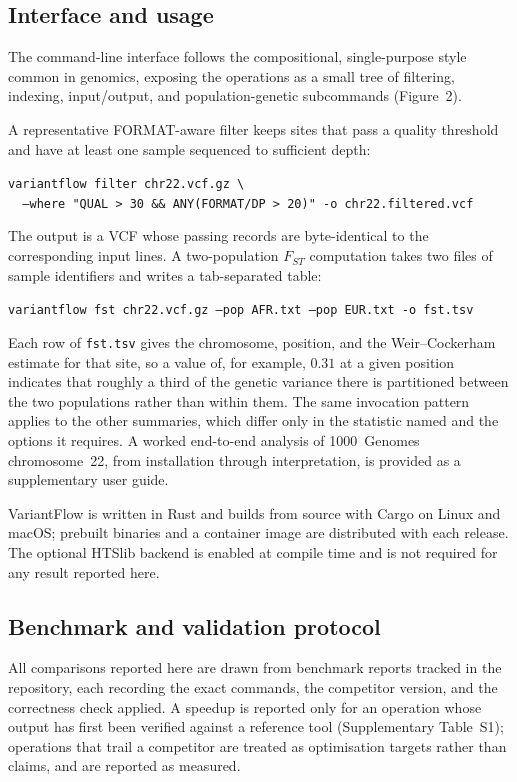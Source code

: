 \subsection{Interface and usage}

The command-line interface follows the compositional, single-purpose style common
in genomics, exposing the operations as a small tree of filtering, indexing,
input/output, and population-genetic subcommands (Figure~2).

A representative FORMAT-aware filter keeps sites that pass a quality threshold
and have at least one sample sequenced to sufficient depth:

{\small
\texttt{variantflow filter chr22.vcf.gz \textbackslash}\\
\texttt{~~--where "QUAL > 30 \&\& ANY(FORMAT/DP > 20)" -o chr22.filtered.vcf}
}

\noindent
The output is a VCF whose passing records are byte-identical to the
corresponding input lines. A two-population $F_{ST}$ computation takes two files
of sample identifiers and writes a tab-separated table:

{\small
\texttt{variantflow fst chr22.vcf.gz --pop AFR.txt --pop EUR.txt -o fst.tsv}
}

\noindent
Each row of \texttt{fst.tsv} gives the chromosome, position, and the
Weir--Cockerham estimate for that site, so a value of, for example, $0.31$ at a
given position indicates that roughly a third of the genetic variance there is
partitioned between the two populations rather than within them. The same
invocation pattern applies to the other summaries, which differ only in the
statistic named and the options it requires. A worked end-to-end analysis of
1000~Genomes chromosome~22, from installation through interpretation, is provided
as a supplementary user guide.

VariantFlow is written in Rust and builds from source with Cargo on Linux and
macOS; prebuilt binaries and a container image are distributed with each release.
The optional HTSlib backend is enabled at compile time and is not required for
any result reported here.

\subsection{Benchmark and validation protocol}

All comparisons reported here are drawn from benchmark reports tracked in the
repository, each recording the exact commands, the competitor version, and the
correctness check applied. A speedup is reported only for an operation whose
output has first been verified against a reference tool (Supplementary
Table~S1); operations that trail a competitor are treated as optimisation
targets rather than claims, and are reported as measured.

